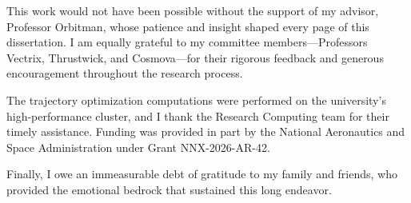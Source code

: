 This work would not have been possible without the support of my advisor, Professor Orbitman, whose
patience and insight shaped every page of this dissertation. I am equally grateful to my committee
members---Professors Vectrix, Thrustwick, and Cosmova---for their rigorous feedback and generous
encouragement throughout the research process.

The trajectory optimization computations were performed on the university's high-performance cluster,
and I thank the Research Computing team for their timely assistance. Funding was provided in part by
the National Aeronautics and Space Administration under Grant NNX-2026-AR-42.

Finally, I owe an immeasurable debt of gratitude to my family and friends, who provided the
emotional bedrock that sustained this long endeavor.
